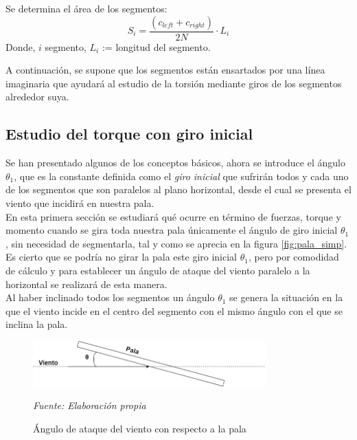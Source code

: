 \begin{definicion}
Se determina el área de los segmentos:
$$ S_{i} = \dfrac{(c_{left} + c_{right})}{2N} \cdot L_i $$
Donde,
\centering $i$ \in segmento, \hspace{7} $L_i$ := longitud del segmento.
\label{def:area_segmentos}
\end{definicion}

A continuación, se supone que los segmentos están ensartados por una línea imaginaria que ayudará al estudio de la torsión mediante giros de los segmentos alrededor suya.


\subsection{Estudio del torque con giro inicial}
\label{section:torque_giro_inicial}

Se han presentado algunos de los conceptos básicos, ahora se introduce el ángulo $ \theta_1 $, que es la constante definida como el \textit{giro inicial} que sufrirán todos y cada uno de los segmentos que son paralelos al plano horizontal, desde el cual se presenta el viento que incidirá en nuestra pala.\\

En esta primera sección se estudiará qué ocurre en término de fuerzas, torque y momento cuando se gira toda nuestra pala únicamente el ángulo de giro inicial $ \theta_1 $, sin necesidad de segmentarla, tal y como se aprecia en la figura \ref{fig:pala_simp}. \\


Es cierto que se podría no girar la pala este giro inicial $ \theta_1 $, pero por comodidad de cálculo y para establecer un ángulo de ataque del viento paralelo a la horizontal se realizará de esta manera.\\


Al haber inclinado todos los segmentos un ángulo $ \theta_1 $ se genera la situación en la que el viento incide en el centro del segmento con el mismo ángulo con el que se inclina la pala. \\

    \textbf{}
    \begin{figure}[H]
    \centering
    \includegraphics[width=0.8\textwidth]{images/dibujo angulo ataque.drawio.png}
    \caption{Ángulo de ataque del viento con respecto a la pala}
    \textit{Fuente: Elaboración propia}
    \label{fig:dibujo_angulo_ataque}
\end{figure}

